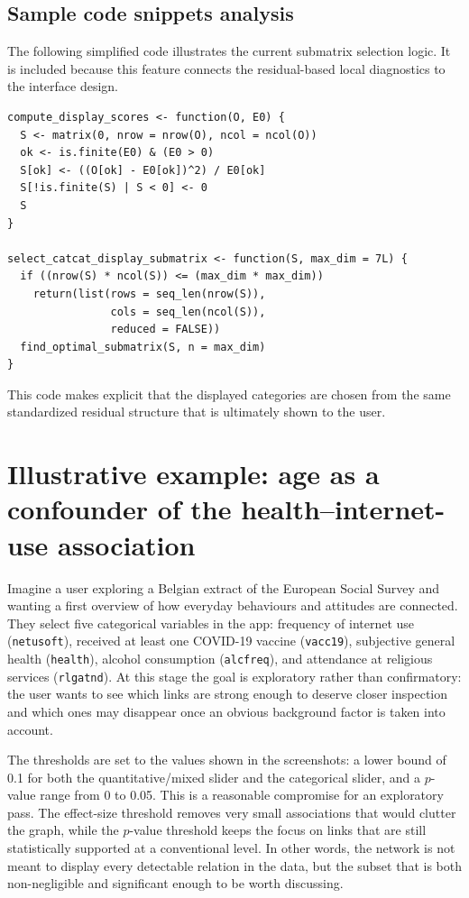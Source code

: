 \documentclass[preprint,12pt,a4paper]{elsarticle}
\numberwithin{equation}{section}
\begin{document}
\subsection{Sample code snippets analysis}

The following simplified code illustrates the current submatrix selection logic. It is included because this feature connects the residual-based local diagnostics to the interface design.

\begin{verbatim}
compute_display_scores <- function(O, E0) {
  S <- matrix(0, nrow = nrow(O), ncol = ncol(O))
  ok <- is.finite(E0) & (E0 > 0)
  S[ok] <- ((O[ok] - E0[ok])^2) / E0[ok]
  S[!is.finite(S) | S < 0] <- 0
  S
}

select_catcat_display_submatrix <- function(S, max_dim = 7L) {
  if ((nrow(S) * ncol(S)) <= (max_dim * max_dim))
    return(list(rows = seq_len(nrow(S)),
                cols = seq_len(ncol(S)),
                reduced = FALSE))
  find_optimal_submatrix(S, n = max_dim)
}
\end{verbatim}

This code makes explicit that the displayed categories are chosen from the same standardized residual structure that is ultimately shown to the user.

\section{Illustrative example: age as a confounder of the health--internet-use association}

Imagine a user exploring a Belgian extract of the European Social Survey and wanting a first overview of how everyday behaviours and attitudes are connected. They select five categorical variables in the app: frequency of internet use (\texttt{netusoft}), received at least one COVID-19 vaccine (\texttt{vacc19}), subjective general health (\texttt{health}), alcohol consumption (\texttt{alcfreq}), and attendance at religious services (\texttt{rlgatnd}). At this stage the goal is exploratory rather than confirmatory: the user wants to see which links are strong enough to deserve closer inspection and which ones may disappear once an obvious background factor is taken into account.

The thresholds are set to the values shown in the screenshots: a lower bound of 0.1 for both the quantitative/mixed slider and the categorical slider, and a $p$-value range from 0 to 0.05. This is a reasonable compromise for an exploratory pass. The effect-size threshold removes very small associations that would clutter the graph, while the $p$-value threshold keeps the focus on links that are still statistically supported at a conventional level. In other words, the network is not meant to display every detectable relation in the data, but the subset that is both non-negligible and significant enough to be worth discussing.
\end{document}
